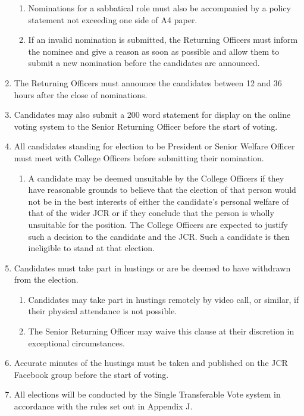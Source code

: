 \documentclass[12pt]{article}
\begin{document}
\begin{enumerate}
\begin{enumerate}
        \item Nominations for a sabbatical role must also be accompanied by a policy statement not exceeding one side of A4 paper.
        \item If an invalid nomination is submitted, the Returning Officers must inform the nominee and give a reason as soon as possible and allow them to submit a new nomination before the candidates are announced.
    \end{enumerate}
    \item The Returning Officers must announce the candidates between 12 and 36 hours after the close of nominations.
    \item Candidates may also submit a 200 word statement for display on the online voting system to the Senior Returning Officer before the start of voting.
    \item All candidates standing for election to be President or Senior Welfare Officer must meet with College Officers before submitting their nomination.
    \begin{enumerate}
        \item A candidate may be deemed unsuitable by the College Officers if they have reasonable grounds to believe that the election of that person would not be in the best interests of either the candidate’s personal welfare of that of the wider JCR or if they conclude that the person is wholly unsuitable for the position. The College Officers are expected to justify such a decision to the candidate and the JCR. Such a candidate is then ineligible to stand at that election.
    \end{enumerate}
    \item Candidates must take part in hustings or are be deemed to have withdrawn from the election.
    \begin{enumerate}
        \item Candidates may take part in hustings remotely by video call, or similar, if their physical attendance is not possible.
        \item The Senior Returning Officer may waive this clause at their discretion in exceptional circumstances.
    \end{enumerate}
    \item Accurate minutes of the hustings must be taken and published on the JCR Facebook group before the start of voting.
    \item All elections will be conducted by the Single Transferable Vote system in accordance with the rules set out in Appendix J.

\end{enumerate}
\end{document}
